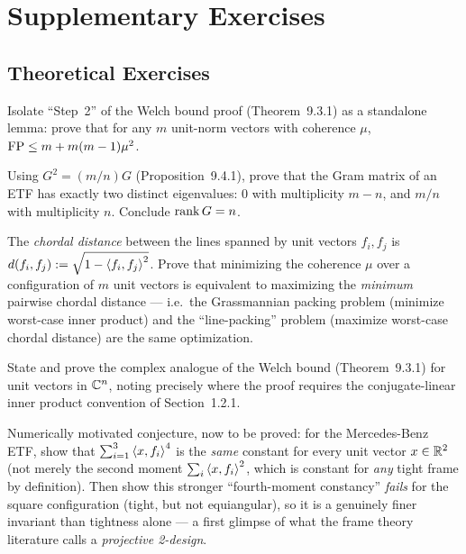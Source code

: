 \section{Supplementary Exercises}
\label{sec:extra-ch9}

\subsection*{Theoretical Exercises}
\begin{theoexercises}
	\item Isolate ``Step~2'' of the Welch bound proof (Theorem~9.3.1) as a
	standalone lemma: prove that for any $m$ unit-norm vectors with
	coherence $\mu$, $\operatorname{FP}\le m+m(m-1)\mu^2$.
	
	\item Using $G^2=(m/n)G$ (Proposition~9.4.1), prove that the Gram
	matrix of an ETF has exactly two distinct eigenvalues: $0$ with
	multiplicity $m-n$, and $m/n$ with multiplicity $n$. Conclude
	$\operatorname{rank} G=n$.
	
	\item The \emph{chordal distance} between the lines spanned by unit
	vectors $f_i,f_j$ is $d(f_i,f_j):=\sqrt{1-\left\langle f_i, f_j \right\rangle^2}$.
	Prove that minimizing the coherence $\mu$ over a configuration of
	$m$ unit vectors is equivalent to maximizing the \emph{minimum}
	pairwise chordal distance --- i.e.\ the Grassmannian packing
	problem (minimize worst-case inner product) and the
	``line-packing'' problem (maximize worst-case chordal distance)
	are the same optimization.
	
	\item State and prove the complex analogue of the Welch bound
	(Theorem~9.3.1) for unit vectors in $\mathbb{C}^n$, noting precisely where
	the proof requires the conjugate-linear inner product convention
	of Section~1.2.1.
	
	\item Numerically motivated conjecture, now to be proved: for the
	Mercedes-Benz ETF, show that $\sum_{i=1}^3\left\langle x, f_i \right\rangle^4$ is the
	\emph{same} constant for every unit vector $x\in\mathbb{R}^2$ (not merely
	the second moment $\sum_i\left\langle x, f_i \right\rangle^2$, which is constant for
	\emph{any} tight frame by definition). Then show this stronger
	``fourth-moment constancy'' \emph{fails} for the square
	configuration (tight, but not equiangular), so it is a genuinely
	finer invariant than tightness alone --- a first glimpse of what
	the frame theory literature calls a \emph{projective 2-design}.
\end{theoexercises}

